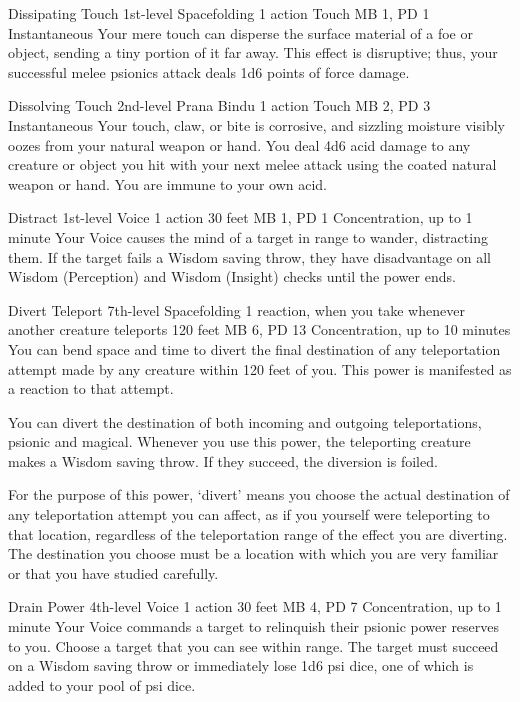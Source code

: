 \DndPowerHeader%
  {Dissipating Touch}
  {1st-level Spacefolding}
  {1 action}
  {Touch}
  {MB 1, PD 1}
  {Instantaneous}
Your mere touch can disperse the surface material of a foe or object,
sending a tiny portion of it far away.
This effect is disruptive; thus,
your successful melee psionics attack deals 1d6 points of force damage.

\DndPowerHeader%
  {Dissolving Touch}
  {2nd-level Prana Bindu}
  {1 action}
  {Touch}
  {MB 2, PD 3}
  {Instantaneous}
  Your touch, claw, or bite is corrosive,
  and sizzling moisture visibly oozes from your
  natural weapon or hand.
  You deal 4d6 acid damage to any creature or object
  you hit with your next melee attack using the coated
  natural weapon or hand.
  You are immune to your own acid.

\DndPowerHeader%
  {Distract}
  {1st-level Voice}
  {1 action}
  {30 feet}
  {MB 1, PD 1}
  {Concentration, up to 1 minute}
Your Voice causes the mind of a target in range to wander,
distracting them.
If the target fails a Wisdom saving throw,
they have disadvantage on all Wisdom (Perception)
and Wisdom (Insight) checks until the power ends.

\DndPowerHeader%
  {Divert Teleport}
  {7th-level Spacefolding}
  {1 reaction, when you take whenever another creature
  teleports}
  {120 feet}
  {MB 6, PD 13}
  {Concentration, up to 10 minutes}
  You can bend space and time to
  divert the final destination of any teleportation attempt
  made by any creature within 120 feet of you.
  This power is manifested as a reaction to that attempt.

  You can divert the destination of both incoming and outgoing
  teleportations,
  psionic and magical.
  Whenever you use this power,
  the teleporting creature makes a Wisdom saving throw.
  If they succeed, the diversion is foiled.
  
  For the purpose of this power,
  `divert' means you choose the actual destination
  of any teleportation attempt you can affect,
  as if you yourself were teleporting to that location,
  regardless of the teleportation range
  of the effect you are diverting.
  The destination you choose must be a location
  with which you are very familiar
  or that you have studied carefully.
  
\DndPowerHeader%
  {Drain Power}
  {4th-level Voice}
  {1 action}
  {30 feet}
  {MB 4, PD 7}
  {Concentration, up to 1 minute}
Your Voice commands a target to relinquish their psionic power
reserves to you.
Choose a target that you can see within range.
The target must succeed on a Wisdom saving throw
or immediately lose 1d6 psi dice, one of which is added
to your pool of psi dice.

